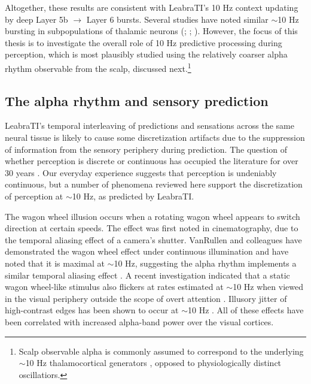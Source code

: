 \documentclass[dwyatte_dissertation.tex]{subfiles}
\begin{document}
Altogether, these results are consistent with LeabraTI's 10 Hz context updating by deep Layer 5b $\rightarrow$ Layer 6 bursts. Several studies have noted similar $\sim$10 Hz bursting in subpopulations of thalamic neurons (; ; ). However, the focus of this thesis is to investigate the overall role of 10 Hz predictive processing during perception, which is most plausibly studied using the relatively coarser alpha rhythm observable from the scalp, discussed next.\footnote{Scalp observable alpha is commonly assumed to correspond to the underlying $\sim$10 Hz thalamocortical generators \cite{LopesdaSilva91,KlimeschSausengHanslmayr07,PalvaPalva07,LorinczKekesiJuhaszEtAl09,BollimuntaMoSchroederEtAl11,HanslmayrGrossKlimeschEtAl11}, opposed to physiologically distinct oscillatiors.}

\subsection{The alpha rhythm and sensory prediction}
LeabraTI's temporal interleaving of predictions and sensations across the same neural tissue is likely to cause some discretization artifacts due to the suppression of information from the sensory periphery during prediction. The question of whether perception is discrete or continuous has occupied the literature for over 30 years \cite[see][for a review]{VanRullenKoch03b}. Our everyday experience suggests that perception is undeniably continuous, but a number of phenomena reviewed here support the discretization of perception at $\sim$10 Hz, as predicted by LeabraTI.

The wagon wheel illusion occurs when a rotating wagon wheel appears to switch direction at certain speeds. The effect was first noted in cinematography, due to the temporal aliasing effect of a camera's shutter. VanRullen and colleagues have demonstrated the wagon wheel effect under continuous illumination and have noted that it is maximal at $\sim$10 Hz, suggesting the alpha rhythm implements a similar temporal aliasing effect \cite{VanRullenReddyKoch05,VanRullenReddyKoch06}. A recent investigation indicated that a static wagon wheel-like stimulus also flickers at rates estimated at $\sim$10 Hz when viewed in the visual periphery outside the scope of overt attention \cite{SokoliukVanRullen13}. Illusory jitter of high-contrast edges has been shown to occur at $\sim$10 Hz \cite{AmanoArnoldTakedaEtAl08}. All of these effects have been correlated with increased alpha-band power over the visual cortices.
\end{document}
